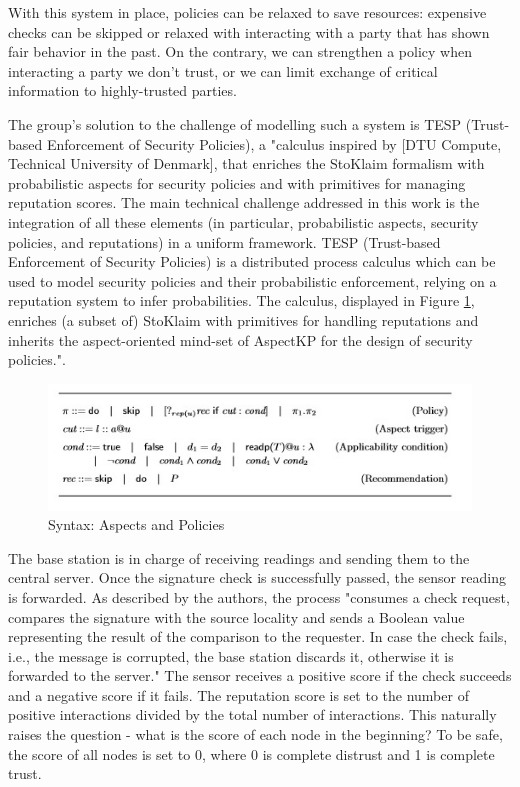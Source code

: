 \documentclass[12pt,a4paper,twoside]{report}
\begin{document}
With this system in place, policies can be relaxed to save resources: expensive checks can be skipped or relaxed with interacting with a party that has shown fair behavior in the past. On the contrary, we can strengthen a policy when interacting a party we don't trust, or we can limit exchange of critical information to highly-trusted parties. \par
The group's solution to the challenge of modelling such a system is TESP (Trust-based Enforcement of Security Policies), a "calculus inspired by [DTU Compute, Technical University of Denmark], that enriches the StoKlaim \cite{sen:2009} formalism with probabilistic aspects for security policies and with primitives for managing reputation scores. The main technical challenge addressed in this work is the integration of all these elements (in particular, probabilistic aspects, security policies, and reputations) in a uniform framework. TESP (Trust-based Enforcement of Security Policies) is a distributed process calculus which can be used to model security policies and their probabilistic enforcement, relying on a reputation system to infer probabilities. The calculus, displayed in Figure \ref{fig:03}, enriches (a subset of) StoKlaim with primitives for handling reputations and inherits the aspect-oriented mind-set of AspectKP for the design of security policies."\cite{vigo;etal:2014}.\par
\begin{figure}[ht]
	\begin{center}
  \includegraphics[width=1.0\textwidth,natwidth=501,natheight=173]{./figures/figure-03.jpg}
  \end{center}
  \caption{Syntax: Aspects and Policies \cite{vigo;etal:2014}}
  \label{fig:03}
\end{figure}
The base station is in charge of receiving readings and sending them to the central server. Once the signature check is successfully passed, the sensor reading is forwarded. As described by the authors, the process "consumes a check request, compares the signature with the source locality and sends a Boolean value representing the result of the comparison to the requester. In case the check fails, i.e., the message is corrupted, the base station discards it, otherwise it is forwarded to the server." The sensor receives a positive score if the check succeeds and a negative score if it fails. The reputation score is set to the number of positive interactions divided by the total number of interactions. This naturally raises the question - what is the score of each node in the beginning? To be safe, the score of all nodes is set to 0, where 0 is complete distrust and 1 is complete trust. \par
\end{document}

